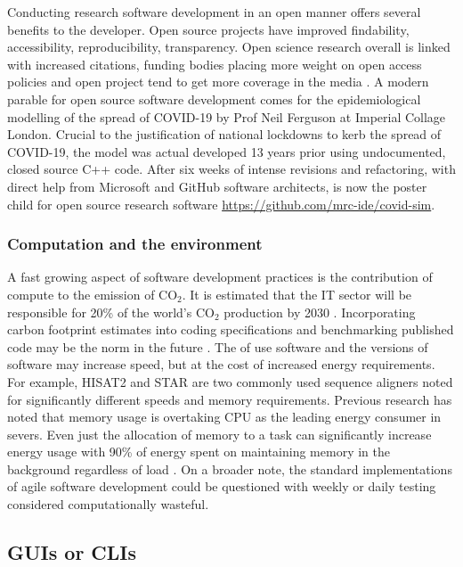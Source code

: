 \documentclass[../main.tex]{subfiles}
\begin{document}
Conducting research software development in an open manner offers several benefits to the developer.
Open source projects have improved findability, accessibility, reproducibility, transparency.
Open science research overall is linked with increased citations, funding bodies placing more weight on open access policies and open project tend to get more coverage in the media \parencite{McKiernan2016}.
A modern parable for open source software development comes for the epidemiological modelling of the spread of COVID-19 by Prof Neil Ferguson at Imperial Collage London.
Crucial to the justification of national lockdowns to kerb the spread of COVID-19, the model was actual developed 13 years prior using undocumented, closed source C++ code.
After six weeks of intense revisions and refactoring, with direct help from Microsoft and GitHub software architects, is now the poster child for open source research software \url{https://github.com/mrc-ide/covid-sim}.

\subsubsection{Computation and the environment}

A fast growing aspect of software development practices is the contribution of compute to the emission of CO$_2$.
It is estimated that the IT sector will be responsible for 20\% of the world's CO$_2$ production by 2030 \parencite{CCEE2020}. 
Incorporating carbon footprint estimates into coding specifications and benchmarking published code may be the norm in the future \parencite{Lannelongue2021}.
The of use software and the versions of software may increase speed, but at the cost of increased energy requirements.
For example, HISAT2 and STAR are two commonly used sequence aligners noted for significantly different speeds and memory requirements.
Previous research has noted that memory usage is overtaking CPU as the leading energy consumer in severs.
Even just the allocation of memory to a task can significantly increase energy usage with 90\% of energy spent on maintaining memory in the background regardless of load \parencite{Karyakin2017}.
On a broader note, the standard implementations of agile software development could be questioned with weekly or daily testing considered computationally wasteful.



\subsection{GUIs or CLIs}
\end{document}
